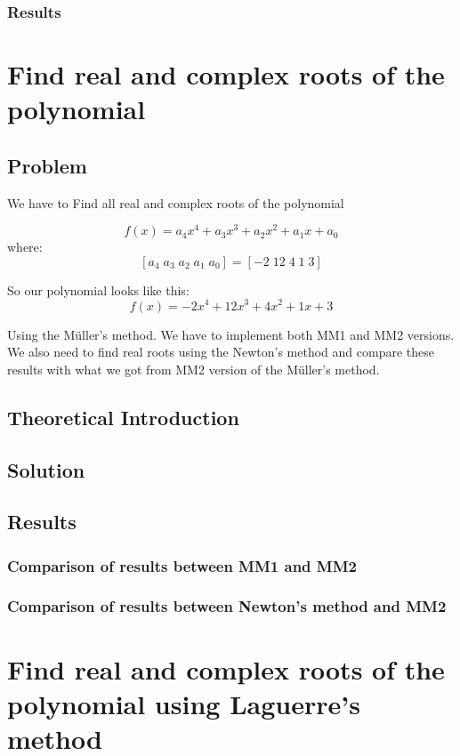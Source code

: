 \documentclass[12pt]{report}
\begin{document}
\subsection{Results}


\chapter{Find real and complex roots of the polynomial}

\section{Problem}

We have to Find all real and complex roots of the polynomial

\[ f(x) = a_4x^4+a_3x^3+a_2x^2+a_1x+a_0 \]
where:
\[ [a_4 \; a_3 \; a_2 \; a_1 \; a_0] = [-2 \; 12 \; 4 \; 1 \; 3] \]

So our polynomial looks like this:
\[ f(x) = -2x^4+12x^3+4x^2+1x+3 \]

Using the M{\"u}ller's method. We have to implement both MM1 and MM2 versions. We also need to find real roots using the Newton's method and compare these results with what we got from MM2 version of the M{\"u}ller's method.
\section{Theoretical Introduction}
\section{Solution}
\section{Results}

\subsection{Comparison of results between MM1 and MM2}
\subsection{Comparison of results between Newton's method and MM2}

\chapter{Find real and complex roots of the polynomial using Laguerre's method}
\end{document}
